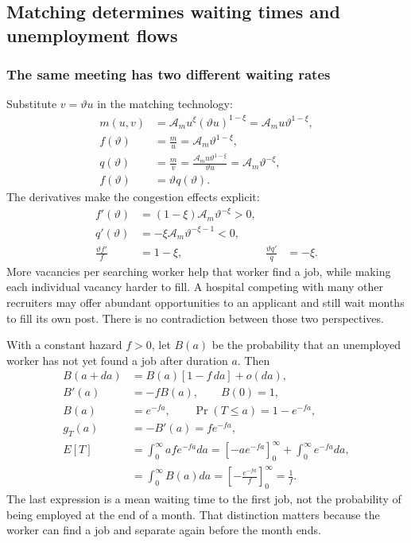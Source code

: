 \subsection{Matching determines waiting times and unemployment flows}

\subsubsection{The same meeting has two different waiting rates}

Substitute $v=\vartheta u$ in the matching technology:
\begin{align}
 m(u,v)&=\mathcal A_m u^\xi(\vartheta u)^{1-\xi}
        =\mathcal A_m u\vartheta^{1-\xi},\\
 f(\vartheta)&=\frac mu=\mathcal A_m\vartheta^{1-\xi},\\
 q(\vartheta)&=\frac mv
   =\frac{\mathcal A_m u\vartheta^{1-\xi}}{\vartheta u}
   =\mathcal A_m\vartheta^{-\xi},\\
 f(\vartheta)&=\vartheta q(\vartheta).
\end{align}
The derivatives make the congestion effects explicit:
\begin{align}
 f'(\vartheta)&=(1-\xi)\mathcal A_m\vartheta^{-\xi}>0,\\
 q'(\vartheta)&=-\xi\mathcal A_m\vartheta^{-\xi-1}<0,\\
 \frac{\vartheta f'}f&=1-\xi,
 &\frac{\vartheta q'}q&=-\xi.
\end{align}
More vacancies per searching worker help that worker find a job, while making
each individual vacancy harder to fill. A hospital competing with many other
recruiters may offer abundant opportunities to an applicant and still wait
months to fill its own post. There is no contradiction between those two
perspectives.

With a constant hazard $f>0$, let $B(a)$ be the probability that an unemployed
worker has not yet found a job after duration $a$. Then
\begin{align}
 B(a+da)&=B(a)[1-f\,da]+o(da),\\
 B'(a)&=-fB(a),\qquad B(0)=1,\\
 B(a)&=e^{-fa},\qquad \Pr(T\leq a)=1-e^{-fa},\\
 g_T(a)&=-B'(a)=fe^{-fa},\\
 E[T]&=\int_0^\infty a f e^{-fa}da
   =[-a e^{-fa}]_0^\infty+\int_0^\infty e^{-fa}da,\\
 &=\int_0^\infty B(a)da
     =\left[-\frac{e^{-fa}}f\right]_0^\infty=\frac1f.
\end{align}
The last expression is a mean waiting time to the first job, not the probability
of being employed at the end of a month. That distinction matters because the
worker can find a job and separate again before the month ends.


